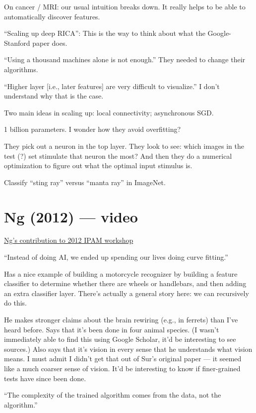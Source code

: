 \documentclass[12pt]{report}
\newcommand{\link}[2]{\href{#1}{#2}}
\begin{document}
On cancer / MRI: our usual intuition breaks down.  It really helps to
be able to automatically discover features.

``Scaling up deep RICA'': This is the way to think about what the
Google-Stanford paper does.

``Using a thousand machines alone is not enough.''  They needed to
change their algorithms.  

``Higher layer [i.e., later features] are very difficult to
visualize.''  I don't understand why that is the case.

Two main ideas in scaling up: local connectivity; asynchronous SGD.  

1 billion parameters.  I wonder how they avoid overfitting?

They pick out a neuron in the top layer.  They look to see: which
images in the test (?) set stimulate that neuron the most?  And then
they do a numerical optimization to figure out what the optimal input
stimulus is.

Classify ``sting ray'' versus ``manta ray'' in ImageNet.

\section{Ng (2012) --- video}

\link{https://www.ipam.ucla.edu/schedule.aspx?pc=gss2012}{Ng's
  contribution to 2012 IPAM workshop}

``Instead of doing AI, we ended up spending our lives doing curve
fitting.''

Has a nice example of building a motorcycle recognizer by building a
feature classifier to determine whether there are wheels or
handlebars, and then adding an extra classifier layer.  There's
actually a general story here: we can recursively do this.

He makes stronger claims about the brain rewiring (e.g., in ferrets)
than I've heard before.  Says that it's been done in four animal
species.  (I wasn't immediately able to find this using Google
Scholar, it'd be interesting to see sources.)  Also says that it's
vision in every sense that he understands what vision means.  I must
admit I didn't get that out of Sur's original paper --- it seemed like
a much coarser sense of vision.  It'd be interesting to know if
finer-grained tests have since been done.

``The complexity of the trained algorithm comes from the data, not the
algorithm.''
\end{document}

